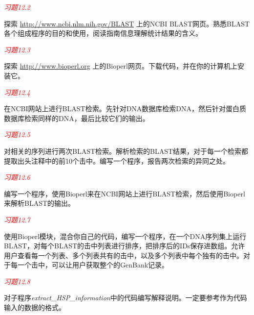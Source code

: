\textcolor{red}{\textit{习题12.2}}
\begin{adjustwidth}{2em}{}
探索 \href{http://www.ncbi.nlm.nih.gov/BLAST}{http://www.ncbi.nlm.nih.gov/BLAST} 上的NCBI BLAST网页。熟悉BLAST各个组成程序的目的和使用，阅读指南信息理解统计结果的含义。
\end{adjustwidth}

\textcolor{red}{\textit{习题12.3}}
\begin{adjustwidth}{2em}{}
探索 \href{http://www.bioperl.org}{http://www.bioperl.org} 上的Bioperl网页。下载代码，并在你的计算机上安装它。
\end{adjustwidth}

\textcolor{red}{\textit{习题12.4}}
\begin{adjustwidth}{2em}{}
在NCBI网站上进行BLAST检索。先针对DNA数据库检索DNA，然后针对蛋白质数据库检索同样的DNA，最后比较它们的输出。
\end{adjustwidth}

\textcolor{red}{\textit{习题12.5}}
\begin{adjustwidth}{2em}{}
对相关的序列进行两次BLAST检索。解析检索的BLAST结果，对于每一个检索都提取出头注释中的前10个击中。编写一个程序，报告两次检索的异同之处。
\end{adjustwidth}

\textcolor{red}{\textit{习题12.6}}
\begin{adjustwidth}{2em}{}
编写一个程序，使用Bioperl来在NCBI网站上进行BLAST检索，然后使用Bioperl来解析BLAST的输出。
\end{adjustwidth}

\textcolor{red}{\textit{习题12.7}}
\begin{adjustwidth}{2em}{}
使用Bioperl模块，混合你自己的代码，编写一个程序，在一个DNA序列集上运行BLAST，对每个BLAST的击中列表进行排序，把排序后的IDs保存进数组。允许用户查看每一个列表、多个列表共有的击中，以及多个列表中每个独有的击中。对于每一个击中，可以让用户获取整个的GenBank记录。
\end{adjustwidth}

\textcolor{red}{\textit{习题12.8}}
\begin{adjustwidth}{2em}{}
对子程序\textit{extract\_HSP\_information}中的代码编写解释说明。一定要参考作为代码输入的数据的格式。
\end{adjustwidth}

